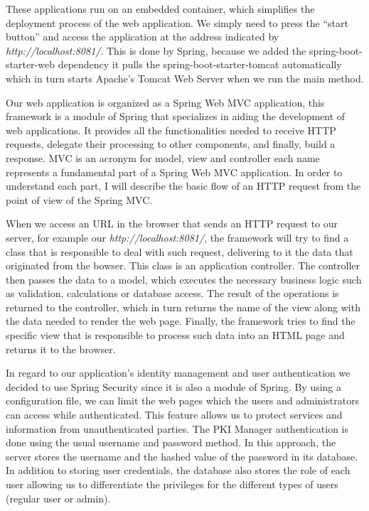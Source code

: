 These applications run on an embedded container, which simplifies the deployment process of the web application. We simply need to press the “start button” and access the application at the address indicated by \textit{http://localhost:8081/}. This is done by Spring, because we added the spring-boot-starter-web dependency it pulls the spring-boot-starter-tomcat automatically which in turn starts Apache’s Tomcat Web Server when we run the main method.

Our web application is organized as a Spring Web MVC application, this framework is a module of Spring that specializes in aiding the development of web applications. It provides all the functionalities needed to receive HTTP requests, delegate their processing to other components, and finally, build a response. MVC is an acronym for model, view and controller each name represents a fundamental part of a Spring Web MVC application. In order to understand each part, I will describe the basic flow of an HTTP request from the point of view of the Spring MVC.

When we access an URL in the browser that sends an HTTP request to our server, for example our \textit{http://localhost:8081/}, the framework will try to find a class that is responsible to deal with such request, delivering to it the data that originated from the bowser. This class is an application controller. The controller then passes the data to a model, which executes the necessary business logic such as validation, calculations or database access. The result of the operations is returned to the controller, which in turn returns the name of the view along with the data needed to render the web page. Finally, the framework tries to find the specific view that is responsible to process such data into an HTML page and returns it to the browser. 

In regard to our application's identity management and user authentication we decided to use Spring Security since it is also a module of Spring. By using a configuration file, we can limit the web pages which the users and administrators can access while authenticated. This feature allows us to protect services and information from unauthenticated parties. The PKI Manager authentication is done using the usual username and password method. In this approach, the server stores the username and the hashed value of the password in its database. In addition to storing user credentials, the database also stores the role of each user allowing us to differentiate the privileges for the different types of users (regular user or admin). 

